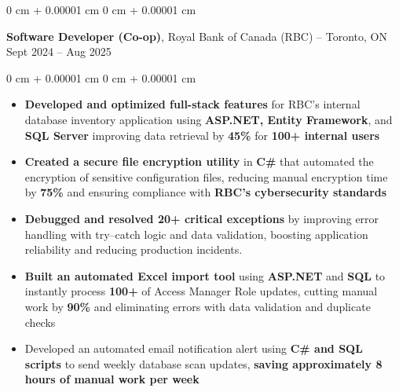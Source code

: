 \documentclass[10pt, letterpaper]{article}
\newenvironment{highlights}{
    \begin{itemize}[
        topsep=0.10 cm,
        parsep=0.10 cm,
        partopsep=0pt,
        itemsep=0pt,
        leftmargin=0 cm + 10pt
    ]
}{
    \end{itemize}
} %
\newenvironment{onecolentry}{
    \begin{adjustwidth}{
        0 cm + 0.00001 cm
    }{
        0 cm + 0.00001 cm
    }
}{
    \end{adjustwidth}
} %
\newenvironment{twocolentry}[2][]{
    \onecolentry
    \def\secondColumn{#2}
    \setcolumnwidth{\fill, 4.5 cm}
    \begin{paracol}{2}
}{
    \switchcolumn \raggedleft \secondColumn
    \end{paracol}
    \endonecolentry
} %
\begin{document}
        \begin{twocolentry}{
            Sept 2024 – Aug 2025
        }
            \textbf{Software Developer (Co-op)}, Royal Bank of Canada (RBC) -- Toronto, ON\end{twocolentry}

        \vspace{0.10 cm}
        \begin{onecolentry}
            \begin{highlights}
                \item \textbf{Developed and optimized full-stack features} for RBC's internal database inventory application using \textbf{ASP.NET, Entity Framework}, and \textbf{SQL Server} improving data retrieval by \textbf{45\%} for \textbf{100+ internal users}
                \item \textbf{Created a secure file encryption utility} in \textbf{C\#} that automated the encryption of sensitive configuration files, reducing manual encryption time by \textbf{75\%} and ensuring compliance with \textbf{RBC’s cybersecurity standards}
                \item \textbf{Debugged and resolved 20+ critical exceptions} by improving error handling with try–catch logic and data validation, boosting application reliability and reducing production incidents.
                \item \textbf{Built an automated Excel import tool} using \textbf{ASP.NET} and \textbf{SQL} to instantly process \textbf{100+} of Access Manager Role updates, cutting manual work by \textbf{90\%} and eliminating errors with data validation and duplicate checks
                \item Developed an automated email notification alert using \textbf{C\# and SQL scripts} to send weekly database scan updates, \textbf{saving approximately 8 hours of manual work per week} 
            \end{highlights}
        \end{onecolentry}
\end{document}
